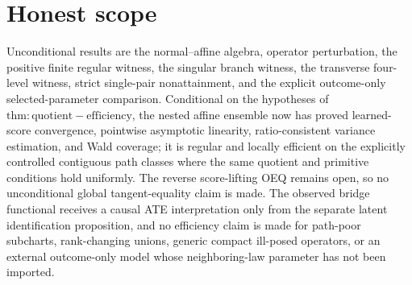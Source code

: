 \documentclass{article}
\begin{document}
\section{Honest scope}

Unconditional results are the normal--affine algebra, operator perturbation, the positive finite regular witness, the singular branch witness, the transverse four-level witness, strict single-pair nonattainment, and the explicit outcome-only selected-parameter comparison. Conditional on the hypotheses of \(\mathrm{thm:quotient-efficiency}\), the nested affine ensemble now has proved learned-score convergence, pointwise asymptotic linearity, ratio-consistent variance estimation, and Wald coverage; it is regular and locally efficient on the explicitly controlled contiguous path classes where the same quotient and primitive conditions hold uniformly. The reverse score-lifting OEQ remains open, so no unconditional global tangent-equality claim is made. The observed bridge functional receives a causal ATE interpretation only from the separate latent identification proposition, and no efficiency claim is made for path-poor subcharts, rank-changing unions, generic compact ill-posed operators, or an external outcome-only model whose neighboring-law parameter has not been imported.
\end{document}
